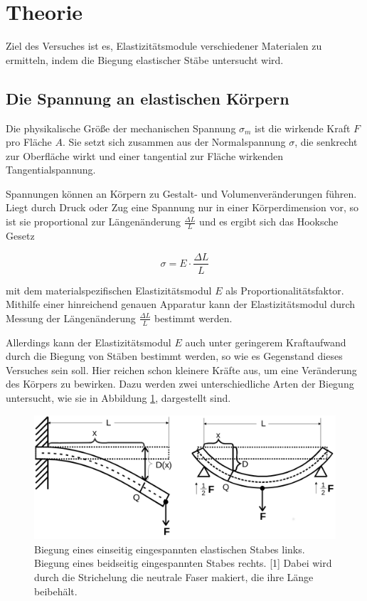 \section{Theorie}
\label{sec:Theorie}

Ziel des Versuches ist es, Elastizitätsmodule verschiedener Materialen
zu ermitteln, indem die Biegung elastischer Stäbe untersucht wird.

\subsection{Die Spannung an elastischen Körpern}

Die physikalische Größe der mechanischen Spannung $\sigma_m$ ist die wirkende
Kraft $F$ pro Fläche $A$. Sie setzt sich zusammen aus der Normalspannung $\sigma$,
die senkrecht zur Oberfläche wirkt und einer tangential zur Fläche wirkenden
Tangentialspannung.

Spannungen können an Körpern zu Gestalt- und Volumenveränderungen
führen. Liegt durch Druck oder Zug eine Spannung nur in einer Körperdimension vor, 
so ist sie proportional zur Längenänderung $\frac{\Delta L}{L}$ und es ergibt sich
das Hooksche Gesetz

\begin{equation*}
    \sigma = E \cdot \frac{\Delta L}{L}
\end{equation*}

mit dem materialspezifischen Elastizitätsmodul $E$ als Proportionalitätsfaktor.
Mithilfe einer hinreichend genauen Apparatur kann der Elastizitätsmodul durch
Messung der Längenänderung $\frac{\Delta L}{L}$ bestimmt werden.

Allerdings kann der Elastizitätsmodul $E$ auch unter geringerem Kraftaufwand
durch die Biegung von Stäben bestimmt werden, so wie es Gegenstand dieses
Versuches sein soll. Hier reichen schon kleinere Kräfte aus, um eine Veränderung 
des Körpers zu bewirken. Dazu werden zwei unterschiedliche Arten der Biegung
untersucht, wie sie in Abbildung \ref{fig:abb1}, dargestellt sind.

\begin{figure}
    \centering
    \includegraphics[scale=0.2]{content/Biegungen.png}
    \caption{Biegung eines einseitig eingespannten elastischen Stabes links.\newline
    Biegung eines beidseitig eingespannten Stabes rechts. [1]\newline
    Dabei wird durch die Strichelung die neutrale Faser makiert, die ihre Länge beibehält.}
    \label{fig:abb1}
\end{figure}

